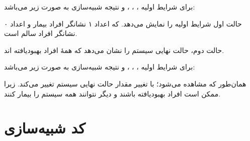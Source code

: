 \documentclass[12pt,onecolumn,a4paper]{article}
\begin{document}
برای شرایط اولیه
،
،
،
و
نتیجه شبیه‌سازی به صورت زیر می‌باشد:

\begin{tcolorbox}[mybox]
        \LTR

\end{tcolorbox}
\RTL

حالت اول شرایط اولیه را نمایش می‌دهد.
که اعداد ۱ نشانگر افراد بیمار و اعداد ۰ نشانگر افراد سالم است.

حالت دوم، حالت نهایی سیستم را نشان می‌دهد
که همهٔ افراد بهبود‌یافته اند.


برای شرایط اولیه
،
،
،
و
نتیجه شبیه‌سازی به صورت زیر می‌باشد:

\begin{tcolorbox}[mybox]
        \LTR

\end{tcolorbox}
\RTL

همان‌طور که مشاهده می‌شود؛ با تغییر مقدار 
حالت نهایی سیستم تغییر می‌کند.
زیرا ممکن است افراد بهبود‌یافته باشند و دیگر نتوانند همه سیستم را بیمار کنند.


\section{کد شبیه‌سازی}
\LTR

\RTL
\end{document}
